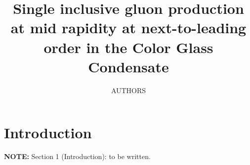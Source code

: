 \documentclass[a4paper,11pt]{article}
\title{Single inclusive gluon production at mid rapidity at next-to-leading order in the Color Glass Condensate}
\author{AUTHORS}
\affiliation{AFFILIATIONS}
\newcommand{\NOTE}[1]{{\color{red}\textbf{NOTE:} #1}}
\begin{document}
\maketitle
\flushbottom

\section{Introduction}\label{sec:intro}
\NOTE{Section 1 (Introduction): to be written.}





\appendix
\sloppy










\end{document}
